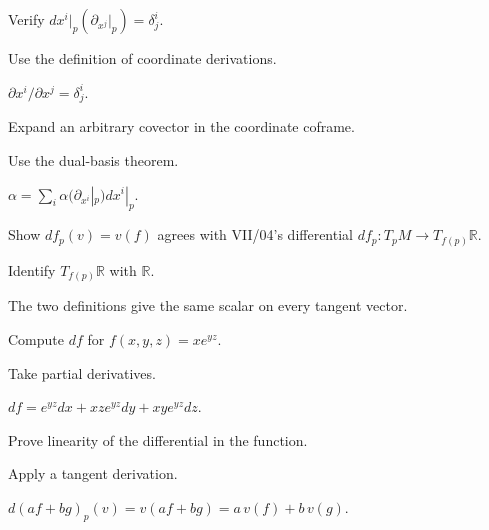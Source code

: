 \begin{exercise}\label{exr:vii05-02}
Verify \(dx^i|_p(\partial_{x^j}|_p)=\delta^i_j\).
\end{exercise}
\begin{hint}
Use the definition of coordinate derivations.
\end{hint}
\begin{solution}
\(\partial x^i/\partial x^j=\delta^i_j\).
\end{solution}

\begin{exercise}\label{exr:vii05-03}
Expand an arbitrary covector in the coordinate coframe.
\end{exercise}
\begin{hint}
Use the dual-basis theorem.
\end{hint}
\begin{solution}
\(\alpha=\sum_i\alpha(\partial_{x^i}|_p)dx^i|_p\).
\end{solution}

\begin{exercise}\label{exr:vii05-04}
Show \(df_p(v)=v(f)\) agrees with VII/04's differential \(df_p:T_pM\to T_{f(p)}\mathbb R\).
\end{exercise}
\begin{hint}
Identify \(T_{f(p)}\mathbb R\) with \(\mathbb R\).
\end{hint}
\begin{solution}
The two definitions give the same scalar on every tangent vector.
\end{solution}

\begin{exercise}\label{exr:vii05-05}
Compute \(df\) for \(f(x,y,z)=xe^{yz}\).
\end{exercise}
\begin{hint}
Take partial derivatives.
\end{hint}
\begin{solution}
\(df=e^{yz}dx+xze^{yz}dy+xye^{yz}dz\).
\end{solution}

\begin{exercise}\label{exr:vii05-06}
Prove linearity of the differential in the function.
\end{exercise}
\begin{hint}
Apply a tangent derivation.
\end{hint}
\begin{solution}
\(d(af+bg)_p(v)=v(af+bg)=a\,v(f)+b\,v(g)\).
\end{solution}

